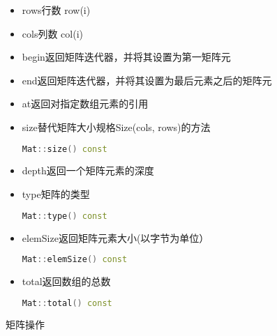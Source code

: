 \documentclass[12pt]{article}
\begin{document}
\begin{itemize}
\item rows行数 \quad row(i)
\item cols列数 \quad col(i)
\item begin返回矩阵迭代器，并将其设置为第一矩阵元
\item end返回矩阵迭代器，并将其设置为最后元素之后的矩阵元
\item at返回对指定数组元素的引用
\item size替代矩阵大小规格Size(cols, rows)的方法
	\begin{lstlisting}[language=c++]
	Mat::size() const
	\end{lstlisting}
\item depth返回一个矩阵元素的深度
\item type矩阵的类型
	\begin{lstlisting}[language=c++]
	Mat::type() const
	\end{lstlisting}
\item elemSize返回矩阵元素大小(以字节为单位）
	\begin{lstlisting}[language=c++]
	Mat::elemSize() const
	\end{lstlisting}
\item total返回数组的总数
	\begin{lstlisting}[language=c++]
	Mat::total() const
	\end{lstlisting}
\end{itemize}
矩阵操作
\end{document}
